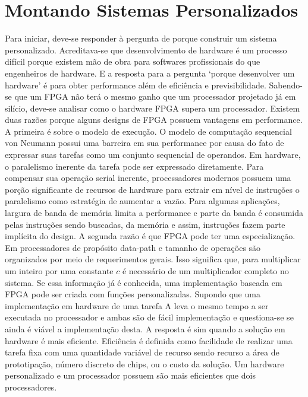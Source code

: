 \section{Montando Sistemas Personalizados}
Para iniciar, deve-se responder à pergunta de porque construir um sistema personalizado. Acreditava-se que desenvolvimento de hardware é um processo difícil porque existem mão de obra para softwares profissionais do que engenheiros de hardware. E a resposta para a pergunta ‘porque desenvolver um hardware’ é para obter performance além de eficiência e previsibilidade. 
Sabendo-se que um FPGA não terá o mesmo ganho que um processador projetado já em silício, deve-se analisar como o hardware FPGA supera um processador. Existem duas razões porque alguns designs de FPGA possuem vantagens em performance. A primeira é sobre o modelo de execução. O modelo de computação sequencial von Neumann possui uma barreira em sua performance por causa do fato de expressar suas tarefas como um conjunto sequencial de operandos. Em hardware, o paralelismo inerente da tarefa pode ser expressado diretamente. Para compensar sua operação serial inerente, processadores modernos possuem uma porção significante de recursos de hardware para extrair em nível de instruções o paralelismo como estratégia de aumentar a vazão. Para algumas aplicações, largura de banda de memória limita a performance e parte da banda é consumida pelas instruções sendo buscadas, da memória e assim, instruções fazem parte implícita do design. A segunda razão é que FPGA pode ter uma especialização. Em processadores de propósito data-path e tamanho de operações são organizados por meio de requerimentos gerais. Isso significa que, para multiplicar um inteiro por uma constante $ c $ é necessário de um multiplicador completo no sistema. Se essa informação já é conhecida, uma implementação baseada em FPGA pode ser criada com funções personalizadas. 
Supondo que uma implementação em hardware de uma tarefa A leva o mesmo tempo a ser executada no processador e ambas são de fácil implementação e questiona-se se ainda é viável a implementação desta. A resposta é sim quando a solução em hardware é mais eficiente. Eficiência é definida como facilidade de realizar uma tarefa fixa com uma quantidade variável de recurso sendo recurso a área de prototipação, número discreto de chips, ou o custo da solução. Um hardware personalizado e um processador possuem são mais eficientes que dois processadores.
